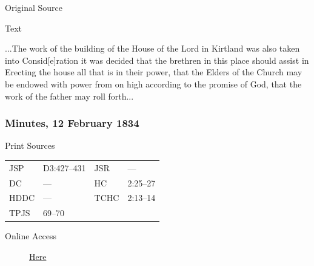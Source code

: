 				\begin{description}
					\item[Original Source]
				\end{description}
				
				
				\begin{description}
					\item[Text]
				\end{description}
				
					...The work of the building of the House of the Lord in Kirtland was also taken into Consid[e]ration it was decided that the brethren in this place should assist in Erecting the house all that is in their power, that the Elders of the Church may be endowed with power from on high according to the promise of God, that the work of the father may roll forth...
					
		\subsubsection{Minutes, 12 February 1834}
			\label{EMS-1834-JS-12-FEB-1834}
			
			\begin{description}
					\item[Print Sources]
				\end{description}

					\begin{tabular}{p{0.5in}p{1in}p{0.5in}p{1in}}
					JSP	 	& D3:427--431		& JSR 		& --- \\
					DC	 	& --- 		& HC 		& 2:25--27 \\
					HDDC 	& ---		& TCHC 		& 2:13--14 \\
					TPJS 	& 69--70		& 	 		&  \\
					\end{tabular}
				
				\begin{description}
					\item[Online Access] \href{https://www.josephsmithpapers.org/paper-summary/minutes-12-february-1834/1}{Here}
				\end{description}
				
